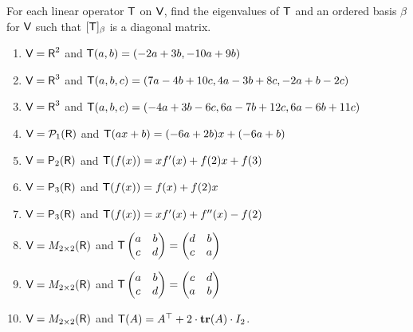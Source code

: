 \begin{exercise} \label{exercise 5.1.5}
For each linear operator \(\textsf{T}\) on \(\textsf{V}\), find the eigenvalues of \(\textsf{T}\) and an ordered basis \(\beta\) for \(\textsf{V}\) such that \([\textsf{T}]_{\beta}\) is a diagonal matrix.
\begin{enumerate}
\item \(\textsf{V} = \textsf{R}^2\) and \(\textsf{T}(a, b) = (-2a + 3b, -10a + 9b)\)
\item \(\textsf{V} = \textsf{R}^3\) and \(\textsf{T}(a, b, c) = (7a - 4b + 10c, 4a - 3b + 8c, -2a + b - 2c)\)
\item \(\textsf{V} = \textsf{R}^3\) and \(\textsf{T}(a, b, c) = (-4a + 3b - 6c, 6a - 7b + 12c, 6a - 6b + 11c)\)
\item \(\textsf{V} = \mathcal{P}_1(\textsf{R})\) and \(\textsf{T}(ax + b) = (-6a + 2b)x + (-6a + b)\)
\item \(\textsf{V} = \textsf{P}_2(\textsf{R})\) and \(\textsf{T}(f(x)) = xf'(x) + f(2)x + f(3)\)
\item \(\textsf{V} = \textsf{P}_3(\textsf{R})\) and \(\textsf{T}(f(x)) = f(x) + f(2)x\)
\item \(\textsf{V} = \textsf{P}_3(\textsf{R})\) and \(\textsf{T}(f(x)) = xf'(x) + f''(x) - f(2)\)
\item \(\textsf{V} = M_{2 \times 2}(\textsf{R})\) and \(\textsf{T} \begin{pmatrix} a & b \\ c & d \end{pmatrix} = \begin{pmatrix} d & b \\ c & a \end{pmatrix}\)
\item \(\textsf{V} = M_{2 \times 2}(\textsf{R})\) and \(\textsf{T} \begin{pmatrix} a & b \\ c & d \end{pmatrix} = \begin{pmatrix} c & d \\ a & b \end{pmatrix}\)
\item \(\textsf{V} = M_{2 \times 2}(\textsf{R})\) and \(\textsf{T}(A) = A^\top + 2 \cdot \textbf{tr}(A) \cdot I_2\).
\end{enumerate}
\end{exercise}

